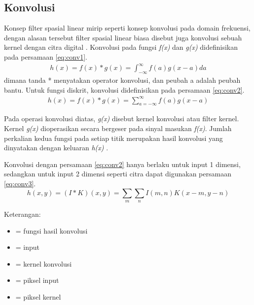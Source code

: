 \subsection{Konvolusi}
Konsep filter spasial linear mirip seperti konsep konvolusi pada domain frekuensi, dengan alasan tersebut filter spasial linear biasa disebut juga konvolusi sebuah kernel dengan citra digital \cite{book:gonzalez}. Konvolusi pada fungsi \textit{f(x)} dan \textit{g(x)} didefinisikan pada persamaan \ref{eq:conv1}.
\begin{equation}
    \label{eq:conv1}
    \begin{split}
h(x) = f(x) * g(x) = \int_{-\infty}^{\infty} f(a) g(x-a) da
    \end{split}
\end{equation}
dimana tanda * menyatakan operator konvolusi, dan peubah a adalah peubah bantu. Untuk fungsi diskrit, konvolusi didefinisikan pada persamaan \ref{eq:conv2}.
\begin{equation}
    \label{eq:conv2}
    \begin{split}
h(x) = f(x) * g(x) = \sum_{a=-\infty}^{\infty} f(a)g(x-a)
    \end{split}
\end{equation}

Pada operasi konvolusi diatas, \textit{g(x)} disebut kernel konvolusi atau filter kernel. Kernel \textit{g(x)} dioperasikan secara bergeser pada sinyal masukan \textit{f(x)}. Jumlah perkalian kedua fungsi pada setiap titik merupakan hasil konvolusi yang dinyatakan dengan keluaran \textit{h(x)} \cite{book:munir}. 

Konvolusi dengan persamaan \ref{eq:conv2} hanya berlaku untuk input 1 dimensi, sedangkan untuk input 2 dimensi seperti citra dapat digunakan persamaan \ref{eq:conv3}.
\begin{equation}
    \label{eq:conv3}
h(x,y) = (I*K)(x,y) = \sum_{m} \sum_{n} I(m,n)K(x-m, y-n)
\end{equation}

\noindent Keterangan: 
\begin{itemize}[noitemsep, topsep=0pt]
    \item[]{ = fungsi hasil konvolusi}
    \item[]{ = input}
    \item[]{ = kernel konvolusi}
    \item[]{ = piksel input}
    \item[]{ = piksel kernel}
\end{itemize}

